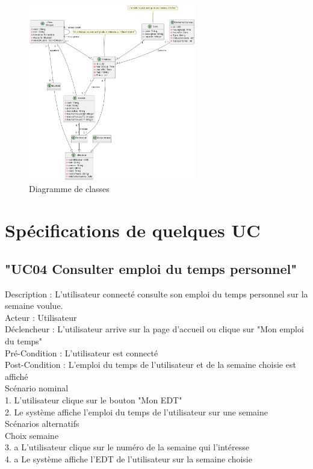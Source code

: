 \documentclass[a4paper,12pt]{article}
\begin{document}
\begin{figure}[h]
    \centering
    \includegraphics[width=0.65\textwidth]{classes.png}
    \caption{Diagramme de classes}
    \label{fig:uml_classes}
\end{figure}

\section {Spécifications de quelques UC}

\subsection{"UC04 Consulter emploi du temps personnel"}
Description : L'utilisateur connecté consulte son emploi du temps personnel sur la semaine voulue.\\
Acteur : Utilisateur \\
Déclencheur : L'utilisateur arrive sur la page d'accueil ou clique sur "Mon emploi du temps"\\
Pré-Condition : L'utilisateur est connecté\\
Post-Condition : L'emploi du temps de l'utilisateur et de la semaine choisie est affiché\\

Scénario nominal\\
1. L'utilisateur clique sur le bouton "Mon EDT"\\
2. Le système affiche l'emploi du temps de l'utilisateur sur une semaine\\

Scénarios alternatifs\\
Choix semaine\\
3. a L'utilisateur clique sur le numéro de la semaine qui l'intéresse\\
4. a Le système affiche l'EDT de l'utilisateur sur la semaine choisie\\
\end{document}
